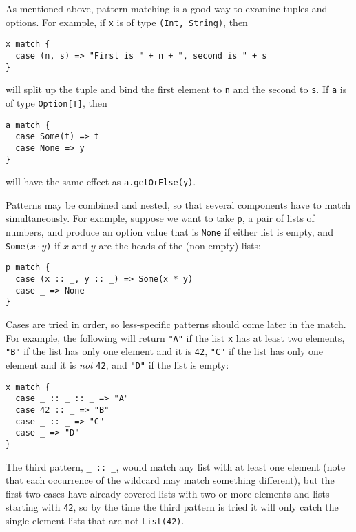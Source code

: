 As mentioned above, pattern matching is a good way to examine tuples and options. For example, if \texttt{x} is of type \texttt{(Int, String)}, then
\begin{verbatim}
x match {
  case (n, s) => "First is " + n + ", second is " + s
}
\end{verbatim}
will split up the tuple and bind the first element to \texttt{n} and the second to \texttt{s}. If \texttt{a} is of type \texttt{Option[T]}, then
\begin{verbatim}
a match {
  case Some(t) => t
  case None => y
}
\end{verbatim}
will have the same effect as \texttt{a.getOrElse(y)}.

Patterns may be combined and nested, so that several components have to match simultaneously. For example, suppose we want to take \texttt{p}, a pair of lists of numbers, and produce an option value that is \texttt{None} if either list is empty, and \texttt{Some($x\cdot y$)} if $x$ and $y$ are the heads of the (non-empty) lists:
\begin{verbatim}
p match {
  case (x :: _, y :: _) => Some(x * y)
  case _ => None
}
\end{verbatim}
Cases are tried in order, so less-specific patterns should come later in the match. For example, the following will return \verb|"A"| if the list \texttt{x} has at least two elements, \verb|"B"| if the list has only one element and it is \texttt{42}, \verb|"C"| if the list has only one element and it is \emph{not} \texttt{42}, and \verb|"D"| if the list is empty:
\begin{verbatim}
x match {
  case _ :: _ :: _ => "A"
  case 42 :: _ => "B"
  case _ :: _ => "C"
  case _ => "D"
}
\end{verbatim}
The third pattern, \verb|_ :: _|, would match any list with at least one element (note that each occurrence of the wildcard may match something different), but the first two cases have already covered lists with two or more elements and lists starting with \texttt{42}, so by the time the third pattern is tried it will only catch the single-element lists that are not \texttt{List(42)}.

